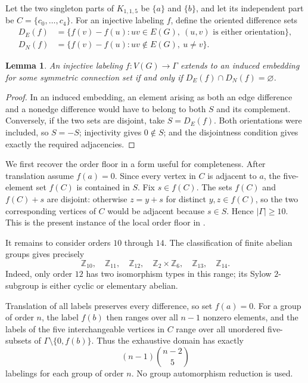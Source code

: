 \documentclass[11pt]{article}
\newtheorem{lemma}[theorem]{Lemma}
\newcommand{\Z}{\mathbb Z}
\begin{document}
Let the two singleton parts of $K_{1,1,5}$ be $\{a\}$ and $\{b\}$, and
let its independent part be $C=\{c_0,\ldots,c_4\}$.  For an injective
labeling $f$, define the oriented difference sets
\begin{align*}
 D_E(f)&=\{f(v)-f(u):uv\in E(G),\ (u,v)\text{ is either orientation}\},\\
 D_N(f)&=\{f(v)-f(u):uv\notin E(G),\ u\ne v\}.
\end{align*}

\begin{lemma}
\label{lem:criterion}
An injective labeling $f:V(G)\to\Gamma$ extends to an induced embedding
for some symmetric connection set if and only if
$D_E(f)\cap D_N(f)=\varnothing$.
\end{lemma}

\begin{proof}
In an induced embedding, an element arising as both an edge difference and
a nonedge difference would have to belong to both $S$ and its complement.
Conversely, if the two sets are disjoint, take $S=D_E(f)$.  Both
orientations were included, so $S=-S$; injectivity gives $0\notin S$; and
the disjointness condition gives exactly the required adjacencies.
\end{proof}

We first recover the order floor in a form useful for completeness.  After
translation assume $f(a)=0$.  Since every vertex in $C$ is adjacent to
$a$, the five-element set $f(C)$ is contained in $S$.  Fix
$s\in f(C)$.  The sets $f(C)$ and $f(C)+s$ are disjoint: otherwise
$z=y+s$ for distinct $y,z\in f(C)$, so the two corresponding vertices of
$C$ would be adjacent because $s\in S$.  Hence $|\Gamma|\geq10$.  This is
the present instance of the local order floor in
\cite[Theorem~6]{FokamSouopBitjoka2026}.

It remains to consider orders $10$ through $14$.  The classification of
finite abelian groups gives precisely
\[
 \Z_{10},\quad \Z_{11},\quad \Z_{12},\quad
 \Z_2\times\Z_6,\quad \Z_{13},\quad \Z_{14}.
\]
Indeed, only order $12$ has two isomorphism types in this range; its
Sylow $2$-subgroup is either cyclic or elementary abelian.

Translation of all labels preserves every difference, so set $f(a)=0$.
For a group of order $n$, the label $f(b)$ then ranges over all $n-1$
nonzero elements, and the labels of the five interchangeable vertices in
$C$ range over all unordered five-subsets of
$\Gamma\setminus\{0,f(b)\}$.  Thus the exhaustive domain has exactly
\[
 (n-1)\binom{n-2}{5}
\]
labelings for each group of order $n$.  No group automorphism reduction is
used.
\end{document}
